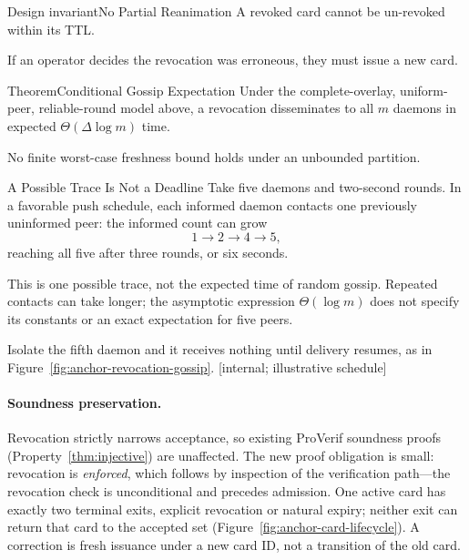 \documentclass[11pt,a4paper]{article}
\theoremstyle{definition}
\begin{document}
\begin{pdclaim}{Design invariant}{No Partial Reanimation}
\setlength{\parskip}{4pt plus 1pt}
\label{prop:no-reanim}
A revoked card cannot be un-revoked within its TTL.

If an operator decides the revocation was erroneous, they must issue a new card.
\end{pdclaim}

\begin{pdclaim}{Theorem}{Conditional Gossip Expectation}
\setlength{\parskip}{4pt plus 1pt}
\label{prop:fresh}
Under the complete-overlay, uniform-peer, reliable-round model above, a revocation disseminates to all $m$ daemons in expected $\Theta(\Delta\log m)$ time.

No finite worst-case freshness bound holds under an unbounded partition.
\end{pdclaim}

\begin{pdexample}{A Possible Trace Is Not a Deadline}
\setlength{\parskip}{4pt plus 1pt}
Take five daemons and two-second rounds. In a favorable push schedule, each
informed daemon contacts one previously uninformed peer: the informed count
can grow
\[
1\to2\to4\to5,
\]
reaching all five after three rounds, or six seconds.

This is one possible trace, not the expected time of random gossip. Repeated
contacts can take longer; the asymptotic expression $\Theta(\log m)$ does not
specify its constants or an exact expectation for five peers.

Isolate the fifth
daemon and it receives nothing until delivery resumes, as in
Figure~\ref{fig:anchor-revocation-gossip}. [internal; illustrative schedule]
\end{pdexample}


\paragraph{Soundness preservation.} Revocation strictly narrows acceptance, so existing ProVerif soundness proofs (Property~\ref{thm:injective}) are unaffected. The new proof obligation is small: revocation is \emph{enforced}, which follows by inspection of the verification path---the revocation check is unconditional and precedes admission. One active card has exactly two terminal exits, explicit revocation or natural expiry; neither exit can return that card to the accepted set (Figure~\ref{fig:anchor-card-lifecycle}). A correction is fresh issuance under a new card ID, not a transition of the old card.
\end{document}
